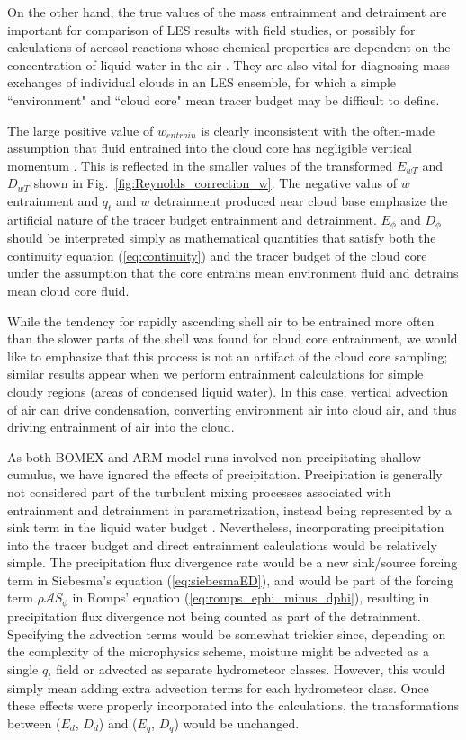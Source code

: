 \documentclass[12pt]{article}
\begin{document}
On the other hand, the true values of the mass entrainment and 
detraiment are important for comparison of LES results with field 
studies, or possibly for calculations of aerosol reactions whose chemical 
properties are dependent on the concentration of liquid water in the air 
\citep{Hoppel1994}.  They are also vital for diagnosing mass exchanges 
of individual clouds in an LES ensemble, for which a simple ``environment" 
and ``cloud core" mean tracer budget may be difficult to define.

The large positive value of $w_{entrain}$ is clearly inconsistent with 
the often-made assumption that fluid entrained into the cloud core has 
negligible vertical momentum \citep{Simpson1969,Gregory2001,Siebesma2003}.  
This is reflected in the smaller values of the transformed $E_{wT}$ and 
$D_{wT}$ shown in Fig.~\ref{fig:Reynolds_correction_w}.  The negative 
valus of $w$ entrainment and $q_t$ and $w$ detrainment produced near 
cloud base emphasize the artificial nature of the tracer budget 
entrainment and detrainment.  $E_{\phi}$ and $D_{\phi}$ should be 
interpreted simply as mathematical quantities that satisfy both the 
continuity equation (\ref{eq:continuity}) and the tracer budget of the 
cloud core under the assumption that the core entrains mean environment 
fluid and detrains mean cloud core fluid.

While the tendency for rapidly ascending shell air to be entrained more 
often than the slower parts of the shell was found for cloud core 
entrainment, we would like to emphasize that this process is not an 
artifact of the cloud core sampling; similar results appear when we 
perform entrainment calculations for simple cloudy regions (areas of 
condensed liquid water).  In this case, vertical advection of air can 
drive condensation, converting environment air into cloud air, and thus 
driving entrainment of air into the cloud.

As both BOMEX and ARM model runs involved non-precipitating shallow 
cumulus, we have ignored the effects of precipitation.  Precipitation is 
generally not considered part of the turbulent mixing processes 
associated with entrainment and detrainment in parametrization, instead 
being represented by a sink term in the liquid water budget 
\citep{Tiedtke1989, Kain1990}.  Nevertheless, incorporating 
precipitation into the tracer budget and direct entrainment calculations 
would be relatively simple.  The precipitation flux divergence rate 
would be a new sink/source forcing term in Siebesma's equation 
(\ref{eq:siebesmaED}), and would be part of the forcing term 
$\rho \mathcal{A}S_\phi$ in Romps' equation 
(\ref{eq:romps_ephi_minus_dphi}), resulting in precipitation flux 
divergence not being counted as part of the detrainment.  Specifying the 
advection terms would be somewhat trickier since, depending on the 
complexity of the microphysics scheme, moisture might be advected as a 
single $q_t$ field or advected as separate hydrometeor classes.  However, 
this would simply mean adding extra advection terms for each hydrometeor 
class.  Once these effects were properly incorporated into the 
calculations, the transformations between ($E_d$, $D_d$) and 
($E_q$, $D_q$) would be unchanged.
\end{document}
